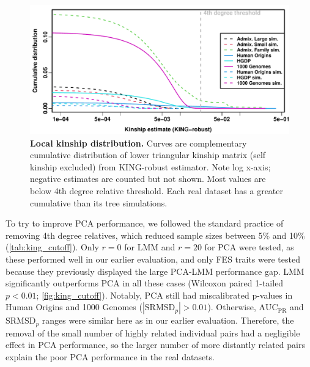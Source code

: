 \documentclass[11pt]{article}
\newcommand{\rmsd}{\text{SRMSD}_p}
\newcommand{\auc}{\text{AUC}_\text{PR}}
\begin{document}
\begin{figure}[bp!]
  \centering
  \includegraphics[width=\textwidth]{king_log-x.pdf}
  \caption{
    {\bf Local kinship distribution.}
    Curves are complementary cumulative distribution of lower triangular kinship matrix (self kinship excluded) from KING-robust estimator.
    Note log x-axis; negative estimates are counted but not shown.
    Most values are below 4th degree relative threshold.
    Each real dataset has a greater cumulative than its tree simulations.
  }
  \label{fig:king}
\end{figure}

To try to improve PCA performance, we followed the standard practice of removing 4th degree relatives, which reduced sample sizes between 5\% and 10\% (\cref{tab:king_cutoff}).
Only $r=0$ for LMM and $r=20$ for PCA were tested, as these performed well in our earlier evaluation, and only FES traits were tested because they previously displayed the large PCA-LMM performance gap.
LMM significantly outperforms PCA in all these cases (Wilcoxon paired 1-tailed $p < 0.01$; \cref{fig:king_cutoff}).
Notably, PCA still had miscalibrated p-values in Human Origins and 1000 Genomes ($|\rmsd| > 0.01$).
Otherwise, $\auc$ and $\rmsd$ ranges were similar here as in our earlier evaluation.
Therefore, the removal of the small number of highly related individual pairs had a negligible effect in PCA performance, so the larger number of more distantly related pairs explain the poor PCA performance in the real datasets.
\end{document}
